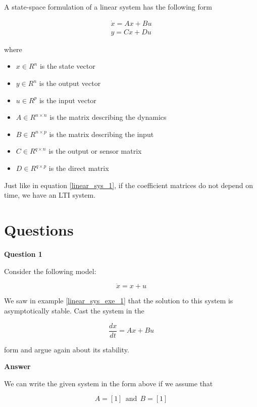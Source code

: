 A state-space formulation of a linear system has the following form



\begin{eqnarray}
\dot{x} = Ax + Bu \\
y = Cx + Du
\label{linear_space_form}
\end{eqnarray}

where

\begin{itemize}
\item $x \in R^{n}$ is the state vector
\item $y \in R^{n}$ is the output vector
\item $u \in R^{p}$ is the input vector 
\item $A \in R^{n \times n}$ is the matrix describing the dynamics 
\item $B \in R^{n \times p}$ is the matrix describing the input 
\item $C \in R^{q \times n}$ is the output or sensor matrix 
\item $D \in R^{q \times p}$ is the direct matrix 
\end{itemize}

Just like in equation \ref{linear_sys_1}, if the coefficient matrices do not depend on time, we have an LTI system.



\section{Questions}


\textbf{Question 1}

Consider the following model:

\begin{equation}
\dot{x} = x +u \nonumber
\end{equation}

We saw in example \ref{linear_sys_exe_1} that the solution to this system is asymptotically stable. Cast the system in the

\begin{equation}
\frac{dx}{dt} = Ax + Bu \nonumber
\end{equation}

form and argue again about its stability.


\textbf{Answer}

We can write the given system in the form above if we assume that

\begin{equation}
A = [1] ~~ \text{and} ~~ B = [1]  \nonumber
\end{equation}

